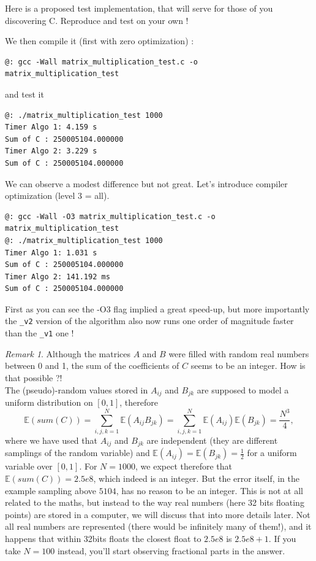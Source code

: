 \documentclass[12pt]{article}
\theoremstyle{plain}
\theoremstyle{remark}
\newtheorem*{remark}{Remark}
\newcommand{\boE}{\mathbb{E}}
\begin{document}
\medskip

Here is a proposed test implementation, that will serve for those of you
discovering C. Reproduce and test on your own !



We then compile it (first with zero optimization) :

\begin{lstlisting}[style=bash]
@: gcc -Wall matrix_multiplication_test.c -o matrix_multiplication_test
\end{lstlisting}

and test it

\begin{lstlisting}[style=bash]
@: ./matrix_multiplication_test 1000
Timer Algo 1: 4.159 s
Sum of C : 250005104.000000
Timer Algo 2: 3.229 s
Sum of C : 250005104.000000
\end{lstlisting}

We can observe a modest difference but not great. Let's introduce compiler
optimization (level 3 = all).

\begin{lstlisting}[style=bash]
@: gcc -Wall -O3 matrix_multiplication_test.c -o matrix_multiplication_test
@: ./matrix_multiplication_test 1000
Timer Algo 1: 1.031 s
Sum of C : 250005104.000000
Timer Algo 2: 141.192 ms
Sum of C : 250005104.000000
\end{lstlisting}

First as you can see the -O3 flag implied a great speed-up, but more importantly 
the {\tt\_v2} version of the algorithm also now runs one order of magnitude faster than 
the {\tt\_v1} one !

\medskip

\begin{remark} Although the matrices $A$ and $B$ 
were filled with random real numbers between 0 and 1, the sum of 
the coefficients of $C$ seems to be an integer. How is that possible ?!\\ 
The (pseudo)-random values stored in $A_{ij}$ and $B_{jk}$  are supposed
to model a uniform distribution on $[0,1]$, therefore
$$
\boE(sum(C)) = \sum_{i,j,k = 1}^N \boE(A_{ij}B_{jk}) =  \sum_{i,j,k = 1}^N
\boE(A_{ij}) \boE(B_{jk}) = \frac{N^3}{4},
$$
where we have used that $A_{ij}$ and $B_{jk}$ are independent (they are
different samplings of the random variable) and $\boE(A_{ij}) = \boE(B_{jk}) =
\frac{1}{2}$ for a uniform variable over $[0,1]$. For $N = 1000$, we expect therefore
that $\boE(sum(C)) = 2.5e8$, which indeed is an integer. But the error itself,
in the example sampling above $5104$, has no reason to be an integer. This is
not at all related to the maths, but instead to the way real numbers (here 32
bits floating points) are stored in a computer, we will discuss that into more
details later. 
Not all real numbers are represented (there would be infinitely
many of them!), and it happens that within 32bits floats the closest float to
$2.5e8$ is $2.5e8 + 1.$ If you take $N = 100$ instead, you'll start
observing fractional parts in the answer.
\end{remark}
\end{document}
